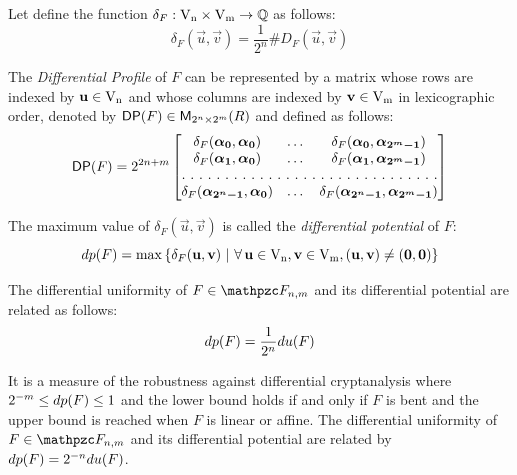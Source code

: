 \begin{definition}
Let define the function $\delta_F : \gf{V_n} \times \gf{V_m} \to \bbbq$ as follows:
\begin{equation}
\delta_F(\vec{u},\vec{v}) = \frac{1}{2^n} \#D_F(\vec{u},\vec{v}) 
\end{equation}
\end{definition} 

\begin{definition}
The \textit{Differential Profile} of $F$ can be represented by a matrix whose rows are indexed by $\vec{u} \in \gf{V_n}$ and whose columns are indexed by $\vec{v} \in \gf{V_m}$ in lexicographic order, denoted by $\matr{DP}(F) \in \matr{M}_{2^n \times 2^m}(R)$ and defined as follows:
\begin{equation*}
\matr{DP}(F) = 2^{2n+m} \begin{bmatrix}
\delta_F(\boldsymbol{\alpha_0},\boldsymbol{\alpha_0})&\dots&\delta_F(\boldsymbol{\alpha_0},\boldsymbol{\alpha_{2^m-1}}) \\
\delta_F(\boldsymbol{\alpha_1},\boldsymbol{\alpha_0})&\dots&\delta_F(\boldsymbol{\alpha_1},\boldsymbol{\alpha_{2^m-1}}) \\
\hdotsfor[2]{3} \\
\delta_F(\boldsymbol{\alpha_{2^n-1}},\boldsymbol{\alpha_0})&\dots&\delta_F(\boldsymbol{\alpha_{2^n-1}},\boldsymbol{\alpha_{2^m-1}}) 
\end{bmatrix} 
\end{equation*}
\end{definition}

\begin{definition}
The maximum value of $\delta_F(\vec{u},\vec{v})$ is called the \textit{differential potential} of $F$:
\begin{equation*}
 \crit{dp}(F) =\max \left\{ \delta_F(\vec{u},\vec{v}) \given \fa \vec{u} \in \gf{V_n}, \vec{v} \in \gf{V_m}, (\vec{u},\vec{v}) \neq (\vec{0},\vec{0}) \right\} 
\end{equation*}
\end{definition}

\begin{corollary}
The differential uniformity of $F \in \funct{F}_{n,m}$ and its differential potential are related as follows:
\begin{equation}
\crit{dp}(F) = \frac{1}{2^n} \crit{du}(F)
\end{equation}
\end{corollary}

It is a measure of the robustness against differential cryptanalysis where $2^{-m} \leq \crit{dp}(F) \leq 1$ and the lower bound holds if and only if $F$ is bent and the upper bound is reached when $F$ is linear or affine.  The differential uniformity of $F \in \funct{F}_{n,m}$ and its differential potential are related by $\crit{dp}(F) = 2^{-n} \crit{du}(F)$. 

